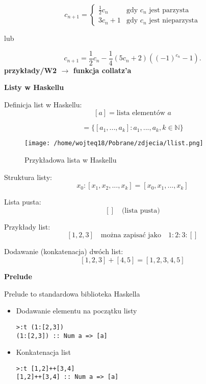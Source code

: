 \documentclass{article}
\begin{document}
\[
c_{n+1} =
\begin{cases} 
\frac{1}{2} c_n & \text{gdy } c_n \text{ jest parzysta} \\
3c_n + 1 & \text{gdy } c_n \text{ jest nieparzysta}
\end{cases}
\]

lub

\[
c_{n+1} = \frac{1}{2} c_n - \frac{1}{4} (5c_n + 2) ((-1)^{c_n} - 1).
\]
\vspace{2\baselineskip}
\textbf{przykłady/W2 $\rightarrow$ funkcja collatz'a} \par
\vspace{1\baselineskip}
\textbf{Listy w Haskellu}

\vspace{1\baselineskip}

Definicja list w Haskellu:
\[
[a] = \text{lista elementów } a
\]

\[
= \{[a_{1}, ..., a_{k}]: a_{1}, ..., a_{k}, k \in \mathbb{N} \}
\]

\vspace{1\baselineskip}

\begin{figure}[H]
    \centering
    \texttt{[image: /home/wojteq18/Pobrane/zdjecia/llist.png]}
    \caption{Przykładowa lista w Haskellu}
    \label{fig:example_image}
\end{figure}

\vspace{1\baselineskip}

Struktura listy:
\[
x_0 : [x_1, x_2, ..., x_k] = [x_0, x_1, ..., x_k]
\]

\vspace{1\baselineskip}

Lista pusta:
\[
[] \quad \text{(lista pusta)}
\]

\vspace{1\baselineskip}

Przykłady list:
\[
[1, 2, 3] \quad \text{można zapisać jako} \quad 1:2:3:[]
\]

\vspace{1\baselineskip}

Dodawanie (konkatenacja) dwóch list:
\[
[1, 2, 3] + [4, 5] = [1, 2, 3, 4, 5]
\]

\vspace{1\baselineskip}
\textbf{Prelude} \par
\vspace{1\baselineskip}
Prelude to standardowa biblioteka Haskella \par
\vspace{1\baselineskip}
\begin{itemize}
    \item Dodawanie elementu na początku listy
        \begin{Verbatim}[frame=single]
>:t (1:[2,3])
(1:[2,3]) :: Num a => [a]
        \end{Verbatim}
    \item Konkatenacja list
        \begin{Verbatim}[frame=single]
>:t [1,2]++[3,4]
[1,2]++[3,4] :: Num a => [a]
        \end{Verbatim}
\end{itemize}
\end{document}
